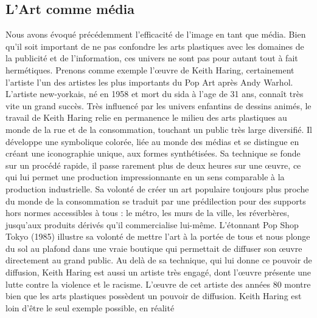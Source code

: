 \subsection{L'Art comme média}
\xspace

	Nous avons évoqué précédemment l'efficacité de l'image en tant que média. Bien qu'il soit important de ne pas confondre les arts plastiques avec les domaines de la publicité et de l'information, ces univers ne sont pas pour autant tout à fait hermétiques. Prenons comme exemple l'\oe{}uvre de Keith Haring, certainement l'artiste l’un des artistes les plus importants du Pop Art après Andy Warhol.  L'artiste new-yorkais, né en 1958 et mort du sida à l'age de 31 ans, connaît très vite un grand succès. Très influencé par les univers enfantins de dessins animés, le travail de Keith Haring relie en permanence le milieu des arts plastiques au monde de la rue et de la consommation, touchant un public très large diversifié. Il développe une symbolique colorée, liée au monde des médias et se distingue en créant une iconographie unique, aux formes synthétisées. Sa technique se fonde sur un procédé rapide, il passe rarement plus de deux heures sur une \oe{}uvre, ce qui lui permet une production impressionnante en un sens comparable à la production industrielle. Sa volonté de créer un art populaire toujours plus proche du monde de la consommation se traduit par une prédilection pour des supports hors normes accessibles à tous : le métro, les murs de la ville, les réverbères, jusqu'aux produits dérivés qu'il commercialise lui-même. 
L'étonnant Pop Shop Tokyo (1985) illustre sa volonté de mettre l'art à la portée de tous et nous plonge du sol au plafond dans une vraie boutique qui permettait de diffuser son \oe{}uvre directement au grand public. Au delà de sa technique, qui lui donne ce pouvoir de diffusion, Keith Haring est aussi un artiste très engagé, dont l'\oe{}uvre présente une lutte contre la violence et le racisme. L'\oe{}uvre de cet artiste des années 80 montre bien que les arts plastiques possèdent un pouvoir de diffusion. Keith Haring est loin d'être le seul exemple possible, en réalité 

